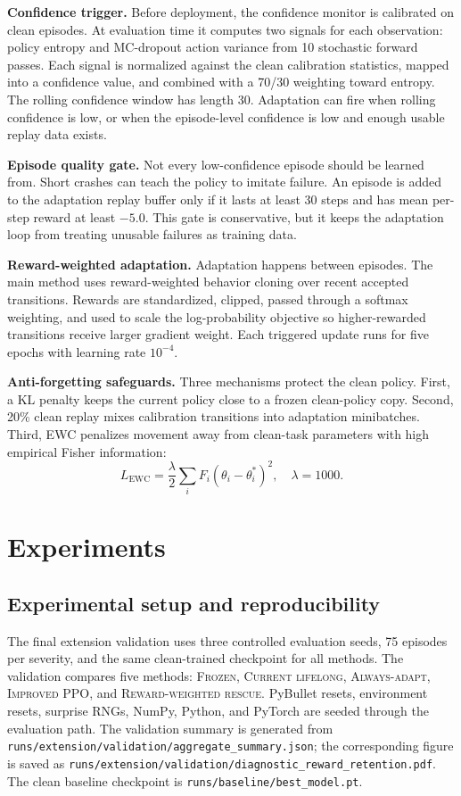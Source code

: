 \documentclass{article}
\begin{document}
\textbf{Confidence trigger.} Before deployment, the confidence monitor is calibrated on clean episodes. At evaluation time it computes two signals for each observation: policy entropy and MC-dropout action variance from 10 stochastic forward passes. Each signal is normalized against the clean calibration statistics, mapped into a confidence value, and combined with a 70/30 weighting toward entropy. The rolling confidence window has length 30. Adaptation can fire when rolling confidence is low, or when the episode-level confidence is low and enough usable replay data exists.

\textbf{Episode quality gate.} Not every low-confidence episode should be learned from. Short crashes can teach the policy to imitate failure. An episode is added to the adaptation replay buffer only if it lasts at least 30 steps and has mean per-step reward at least $-5.0$. This gate is conservative, but it keeps the adaptation loop from treating unusable failures as training data.

\textbf{Reward-weighted adaptation.} Adaptation happens between episodes. The main method uses reward-weighted behavior cloning over recent accepted transitions. Rewards are standardized, clipped, passed through a softmax weighting, and used to scale the log-probability objective so higher-rewarded transitions receive larger gradient weight. Each triggered update runs for five epochs with learning rate $10^{-4}$.

\textbf{Anti-forgetting safeguards.} Three mechanisms protect the clean policy. First, a KL penalty keeps the current policy close to a frozen clean-policy copy. Second, 20\% clean replay mixes calibration transitions into adaptation minibatches. Third, EWC penalizes movement away from clean-task parameters with high empirical Fisher information:
\begin{equation}
  L_{\mathrm{EWC}} = \frac{\lambda}{2}\sum_i F_i(\theta_i - \theta_i^*)^2,
  \quad \lambda = 1000.
\end{equation}

\section{Experiments}

\subsection{Experimental setup and reproducibility}

The final extension validation uses three controlled evaluation seeds, 75 episodes per severity, and the same clean-trained checkpoint for all methods. The validation compares five methods: \textsc{Frozen}, \textsc{Current lifelong}, \textsc{Always-adapt}, \textsc{Improved PPO}, and \textsc{Reward-weighted rescue}. PyBullet resets, environment resets, surprise RNGs, NumPy, Python, and PyTorch are seeded through the evaluation path. The validation summary is generated from \texttt{runs/extension/validation/aggregate\_summary.json}; the corresponding figure is saved as \texttt{runs/extension/validation/diagnostic\_reward\_retention.pdf}. The clean baseline checkpoint is \texttt{runs/baseline/best\_model.pt}.
\end{document}
